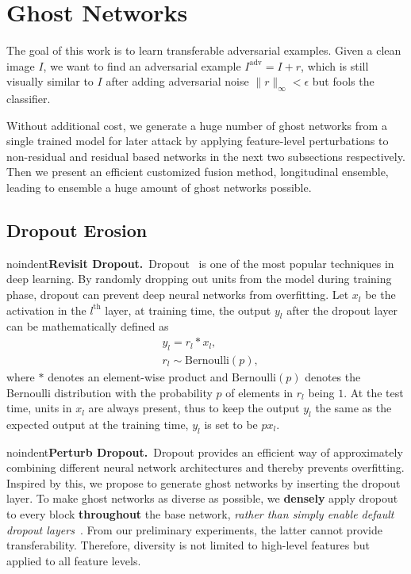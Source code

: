 \documentclass[letterpaper]{article} %
\begin{document}
\section{Ghost Networks} \label{sec:method}
The goal of this work is to learn transferable adversarial examples. Given a clean image $I$, we want to find an adversarial example $I^\text{adv}=I+r$, which is still visually similar to $I$ after adding adversarial noise $\|r\|_\infty<\epsilon$ but fools the classifier. %

Without additional cost, we generate a huge number of ghost networks from a single trained model for later attack by applying feature-level perturbations to non-residual and residual based networks in the next two subsections respectively.
Then we present an efficient customized fusion method, longitudinal ensemble, leading to ensemble a huge amount of ghost networks possible.

\subsection{Dropout Erosion} \label{sec:dropout}
noindent\textbf{Revisit Dropout.}~Dropout~\cite{srivastava2014dropout} is one of the most popular techniques in deep learning. By randomly dropping out units from the model during training phase, dropout can prevent deep neural networks from overfitting.%
Let $x_l$ be the activation in the $l^\text{th}$ layer, at training time, the output $y_l$ after the dropout layer can be mathematically defined as
\begin{equation} \label{eq:dropout}
\begin{split}
& y_l=r_l*x_l, \\
& r_l\sim\text{Bernoulli}(p),
\end{split}
\end{equation}
where $*$ denotes an element-wise product and $\text{Bernoulli}(p)$ denotes the Bernoulli distribution with the probability $p$ of elements in $r_l$ being $1$. At the test time, units in $x_l$ are always present, thus to keep the output $y_l$ the same as the expected output at the training time, $y_l$ is set to be $p x_l$.

noindent\textbf{Perturb Dropout.}~Dropout provides an efficient way of approximately combining different neural network architectures and thereby prevents overfitting. Inspired by this, we propose to generate ghost networks by inserting the dropout layer. To make ghost networks as diverse as possible, we \textbf{densely} apply dropout to every block \textbf{throughout} the base network, \textit{rather than simply enable default dropout layers~\cite{carlini2017adversarial}}. From our preliminary experiments, the latter cannot provide transferability. Therefore, diversity is not limited to high-level features but applied to all feature levels.%
\end{document}
